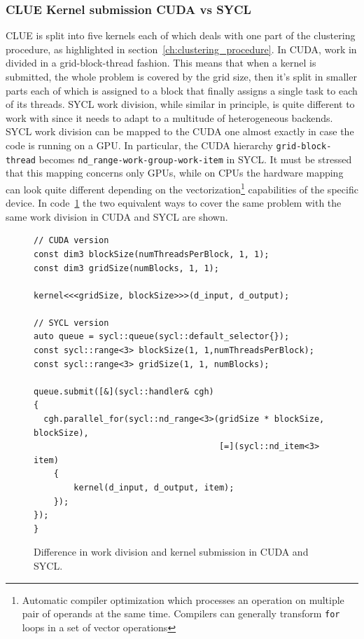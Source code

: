 \subsubsection{CLUE Kernel submission CUDA vs SYCL}
CLUE is split into five kernels each of which deals with one part of the clustering procedure, as highlighted in section~\ref{ch:clustering_procedure}. In CUDA, work in divided in a grid-block-thread fashion. This means that when a kernel is submitted, the whole problem is covered by the grid size, then it's split in smaller parts each of which is assigned to a block that finally assigns a single task to each of its threads. SYCL work division, while similar in principle, is quite different to work with since it needs to adapt to a multitude of heterogeneous backends. SYCL work division can be mapped to the CUDA one almost exactly in case the code is running on a GPU. In particular, the CUDA hierarchy \Verb "grid-block-thread" becomes \Verb "nd_range-work-group-work-item" in SYCL. It must be stressed that this mapping concerns only GPUs, while on CPUs the hardware mapping can look quite different depending on the vectorization\footnote{Automatic compiler optimization which processes an operation on multiple pair of operands at the same time. Compilers can generally transform \Verb "for" loops in a set of vector operations} capabilities of the specific device.
In code~\ref{code:kernel_submission} the two equivalent ways to cover the same problem with the same work division in CUDA and SYCL are shown.

\begin{figure}[ht!]
\renewcommand{\figurename}{Code}
\begin{verbatim}
// CUDA version
const dim3 blockSize(numThreadsPerBlock, 1, 1);
const dim3 gridSize(numBlocks, 1, 1);
 
kernel<<<gridSize, blockSize>>>(d_input, d_output);

// SYCL version
auto queue = sycl::queue(sycl::default_selector{});
const sycl::range<3> blockSize(1, 1,numThreadsPerBlock);
const sycl::range<3> gridSize(1, 1, numBlocks);

queue.submit([&](sycl::handler& cgh) 
{
  cgh.parallel_for(sycl::nd_range<3>(gridSize * blockSize, blockSize), 
                                     [=](sycl::nd_item<3> item)
    {
        kernel(d_input, d_output, item);
    });
});
}
\end{verbatim}
\caption{Difference in work division and kernel submission in CUDA and SYCL.}
\label{code:kernel_submission}
\end{figure}

